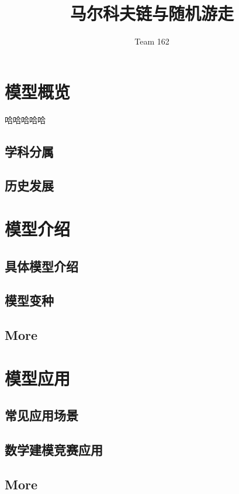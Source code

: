 \documentclass{ctexart}
\title{\textbf{马尔科夫链与随机游走}}
\author{Team 162}
\begin{document}
\maketitle
\tableofcontents
\section{模型概览}
哈哈哈哈哈
\subsection{学科分属}

\subsection{历史发展}

\section{模型介绍}

\subsection{具体模型介绍}

\subsection{模型变种}

\subsection{More}


\section{模型应用}

\subsection{常见应用场景}


\subsection{数学建模竞赛应用}

\subsection{More}
\end{document}
